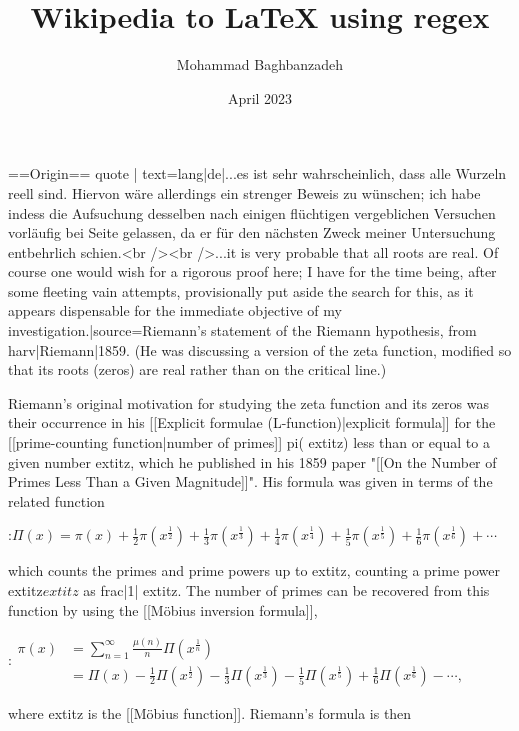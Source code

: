 \documentclass{article}
\title{Wikipedia to LaTeX using regex}
\author{Mohammad Baghbanzadeh}
\date{April 2023}
\begin{document}
\maketitle


==Origin==
{{quote | text={{lang|de|...es ist sehr wahrscheinlich, dass alle Wurzeln reell sind. Hiervon wäre allerdings ein strenger Beweis zu wünschen; ich habe indess die Aufsuchung desselben nach einigen flüchtigen vergeblichen Versuchen vorläufig bei Seite gelassen, da er für den nächsten Zweck meiner Untersuchung entbehrlich schien.}}<br /><br />...it is very probable that all roots are real. Of course one would wish for a rigorous proof here; I have for the time being, after some fleeting vain attempts, provisionally put aside the search for this, as it appears dispensable for the immediate objective of my investigation.|source=Riemann's statement of the Riemann hypothesis, from {{harv|Riemann|1859}}. (He was discussing a version of the zeta function, modified so that its roots (zeros) are real rather than on the critical line.)}}

Riemann's original motivation for studying the zeta function and its zeros was their occurrence in his [[Explicit formulae (L-function)|explicit formula]] for the [[prime-counting function|number of primes]] {{pi}}(	extit{z}) less than or equal to a given number 	extit{z}, which he published in his 1859 paper "[[On the Number of Primes Less Than a Given Magnitude]]". His formula was given in terms of the related function

:$\Pi(x) = \pi(x) + \tfrac{1}{2} \pi(x^{\frac{1}{2}}) +\tfrac{1}{3} \pi(x^{\frac{1}{3}}) + \tfrac{1}{4}\pi(x^{\frac{1}{4}}) + \tfrac{1}{5} \pi(x^{\frac{1}{5}}) +\tfrac{1}{6}\pi(x^{\frac{1}{6}}) +\cdots $

which counts the primes and prime powers up to 	extit{z}, counting a prime power 	extit{z}$	extit{z}$ as {{frac|1|	extit{z}}}. The number of primes can be recovered from this function by using the [[Möbius inversion formula]],

:$\begin{align}
\pi(x) &= \sum_{n=1}^{\infty}\frac{\mu(n)}{n}\Pi(x^{\frac{1}{n}}) \\
       &= \Pi(x) -\frac{1}{2}\Pi(x^{\frac{1}{2}}) - \frac{1}{3}\Pi(x^{\frac{1}{3}}) - \frac{1}{5}\Pi(x^{\frac{1}{5}}) + \frac{1}{6} \Pi(x^{\frac{1}{6}}) -\cdots,
\end{align}$

where 	extit{z} is the [[Möbius function]]. Riemann's formula is then
\end{document}
